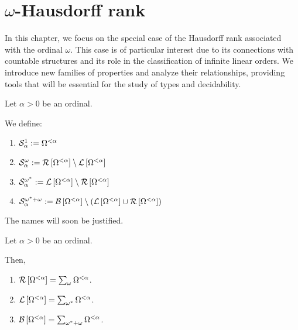 \section{\texorpdfstring{$\omega$}{omega}-Hausdorff rank}

In this chapter, we focus on the special case of the Hausdorff rank associated with the ordinal $\omega$. This case is of particular interest due to its connections with countable structures and its role in the classification of infinite linear orders. We introduce new families of properties and analyze their relationships, providing tools that will be essential for the study of types and decidability.

\begin{definitions}\label{bounded-definitions}
  Let $\alpha > 0$ be an ordinal.

  We define:
  \begin{enumerate}
    \item $\mathcal{S}^{1}_{\alpha} := \Omega^{< \alpha}$
    \item $\mathcal{S}^{\omega}_{\alpha} := \mathcal{R} \left[ {{\Omega^{< \alpha}}} \right] \setminus \mathcal{L} \left[ {{\Omega^{< \alpha}}} \right]$
    \item $\mathcal{S}^{\omega^\ast}_{\alpha} := \mathcal{L} \left[ {{\Omega^{< \alpha}}} \right] \setminus \mathcal{R} \left[ {{\Omega^{< \alpha}}} \right]$
    \item $\mathcal{S}^{\omega^\ast + \omega}_{\alpha} := \mathcal{B} \left[ {{\Omega^{< \alpha}}} \right] \setminus \left( { \mathcal{L} \left[ {{\Omega^{< \alpha}}} \right] \cup \mathcal{R} \left[ {{\Omega^{< \alpha}}} \right] } \right)$
  \end{enumerate}

  The names will soon be justified.
\end{definitions}

\begin{lemma}\label{bounded-structure}
  Let $\alpha > 0$ be an ordinal.

  Then,
  \begin{enumerate}
    \item $\mathcal{R} \left[ {{\Omega^{< \alpha}}} \right] = \sum_{\omega}{\Omega^{< \alpha}}$.
    \item $\mathcal{L} \left[ {{\Omega^{< \alpha}}} \right] = \sum_{\omega^\ast}{\Omega^{< \alpha}}$.
    \item $\mathcal{B} \left[ {{\Omega^{< \alpha}}} \right] = \sum_{\omega^\ast + \omega}{\Omega^{< \alpha}}$.
  \end{enumerate}
\end{lemma}

